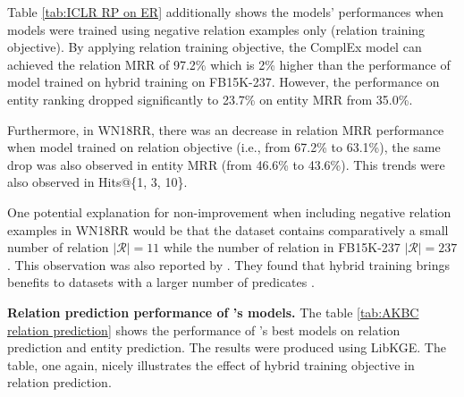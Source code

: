 Table \ref{tab:ICLR RP on ER} additionally shows the models' performances when models were trained using negative relation examples only (relation training objective). By applying relation training objective, the ComplEx model can achieved the relation MRR of 97.2\% which is 2\% higher than the performance of model trained on hybrid training on FB15K-237. However, the performance on entity ranking dropped significantly to 23.7\% on entity MRR from 35.0\%. 

Furthermore, in WN18RR, there was an decrease in relation MRR performance when model trained on relation objective (i.e., from 67.2\% to 63.1\%), the same drop was also observed in entity MRR (from 46.6\% to 43.6\%). This trends were also observed in Hits@\{1, 3, 10\}.


One potential explanation for non-improvement when including negative relation examples in WN18RR would be that the dataset contains comparatively a small number of relation $|\mathcal{R}| = 11$ while the number of relation in FB15K-237 $|\mathcal{R}| = 237$. This observation was also reported by \cite{chen2021relation}. They found that hybrid training brings benefits to datasets with a larger number of predicates \citep{chen2021relation}.
\newline
 
 
\noindent\textbf{Relation prediction performance of \cite{chen2021relation}'s models.} The table \ref{tab:AKBC relation prediction} shows the performance of \citet{chen2021relation}'s best models on relation prediction and entity prediction. The results were produced using LibKGE. The table, one again, nicely illustrates the effect of hybrid training objective in relation prediction. 


